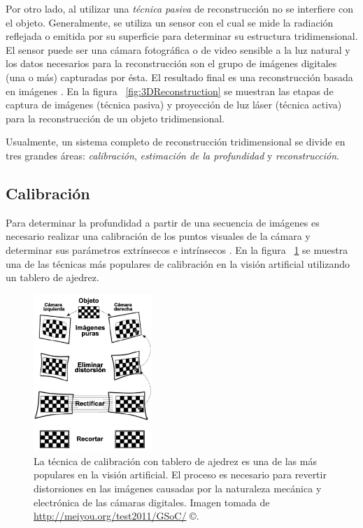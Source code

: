 Por otro lado, al utilizar una \emph{t\'{e}cnica pasiva} de reconstrucci\'{o}n no se interfiere con el objeto. Generalmente, se utiliza un sensor con el cual se mide la radiaci\'{o}n reflejada o emitida por su superficie para determinar su estructura tridimensional. El sensor puede ser una c\'{a}mara fotogr\'{a}fica o de video sensible a la luz natural y los datos necesarios para la reconstrucci\'{o}n son el grupo de im\'{a}genes digitales (una o m\'{a}s) capturadas por \'{e}sta. El resultado final es una reconstrucci\'{o}n basada en im\'{a}genes \cite{Cyganek_Siebert_2009, Jahne_Haussecker_Geibler_1999, Faugeras_1992, Pollefeys_Gool_2002}. En la figura ~\ref{fig:3DReconstruction} se muestran las etapas de captura de im\'{a}genes (t\'{e}cnica pasiva) y proyecci\'{o}n de luz l\'{a}ser (t\'{e}cnica activa) para la reconstrucci\'{o}n de un objeto tridimensional.

Usualmente, un sistema completo de reconstrucci\'{o}n tridimensional se divide en tres grandes \'{a}reas: \emph{calibraci\'{o}n}, \emph{estimaci\'{o}n de la profundidad} y \emph{reconstrucci\'{o}n}.

\subsection{Calibraci\'{o}n}
Para determinar la profundidad a partir de una secuencia de im\'{a}genes es necesario realizar una calibraci\'{o}n de los puntos visuales de la c\'{a}mara y determinar sus par\'{a}metros extr\'{i}nsecos e intr\'{i}nsecos \cite{Jahne_Haussecker_Geibler_1999, Forsyth_Ponce_2002,Cyganek_Siebert_2009,Tsai_R_Y_1987}. En la figura ~\ref{fig:Calibration} se muestra una de las t\'{e}cnicas m\'{a}s populares de calibraci\'{o}n en la visi\'{o}n artificial utilizando un tablero de ajedrez.

\begin{figure}[H]
\centering
\includegraphics[width=0.4\textwidth]{images/calibration2.png}
\caption[T\'{e}cnica de calibraci\'{o}n utilizando un tablero de ajedrez]%
{La t\'{e}cnica de calibraci\'{o}n con tablero de ajedrez es una de las m\'{a}s po\-pu\-la\-res en la visi\'{o}n artificial. El proceso es necesario para revertir distorsiones en las im\'{a}genes causadas por la naturaleza mec\'{a}nica y electr\'{o}nica de las c\'{a}maras digitales. Imagen tomada de \url{http://meiyou.org/test2011/GSoC/} \copyright.}
\label{fig:Calibration}
\end{figure}


